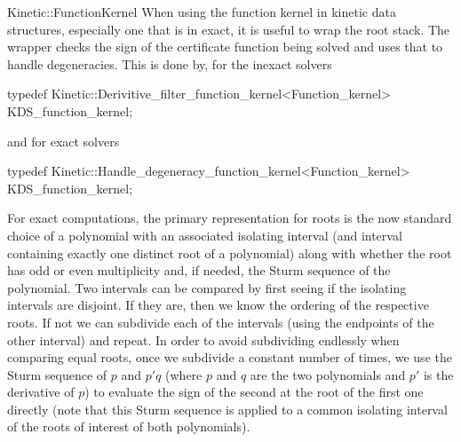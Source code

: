 \begin{ccRefConcept}{Kinetic::FunctionKernel}
When using the function kernel in kinetic data structures, especially
one that is in exact, it is useful to wrap the root stack. The wrapper
checks the sign of the certificate function being solved and uses that
to handle degeneracies. This is done by, for the inexact solvers 
\begin{ccExampleCode}
typedef Kinetic::Derivitive_filter_function_kernel<Function_kernel> KDS_function_kernel;
\end{ccExampleCode}
and for exact solvers
\begin{ccExampleCode}
typedef Kinetic::Handle_degeneracy_function_kernel<Function_kernel> KDS_function_kernel;
\end{ccExampleCode}

For exact computations, the primary representation for roots is the
now standard choice of a polynomial with an associated isolating
interval (and interval containing exactly one distinct root of a
polynomial) along with whether the root has odd or even multiplicity
and, if needed, the Sturm sequence of the polynomial. Two intervals
can be compared by first seeing if the isolating intervals are
disjoint. If they are, then we know the ordering of the respective
roots. If not we can subdivide each of the intervals (using the
endpoints of the other interval) and repeat. In order to avoid
subdividing endlessly when comparing equal roots, once we subdivide a
constant number of times, we use the Sturm sequence of $p$ and $p'q$
(where $p$ and $q$ are the two polynomials and $p'$ is the derivative
of $p$) to evaluate the sign of the second at the root of the first
one directly (note that this Sturm sequence is applied to a common
isolating interval of the roots of interest of both polynomials).



\end{ccRefConcept}



